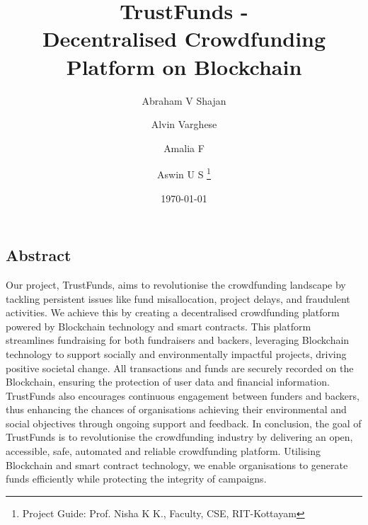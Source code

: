 \documentclass[10pt,A4paper]{article}
\title{\bf{TrustFunds -\\
Decentralised Crowdfunding Platform on Blockchain}}
\author{Abraham V Shajan \and Alvin Varghese \and Amalia F \and Aswin U S 
\thanks {Project Guide: Prof. Nisha K K., Faculty, CSE, RIT-Kottayam}}
\date{\today}
\begin{document}
\maketitle
\vspace{-20pt}
\begin{center}
\section*{Abstract}
\end{center}

Our project, TrustFunds, aims to revolutionise the crowdfunding landscape by tackling persistent issues like fund misallocation, project delays, and fraudulent activities. We achieve this by creating a decentralised crowdfunding platform powered by Blockchain technology and smart contracts.
This platform streamlines fundraising for both fundraisers and backers, leveraging Blockchain technology to support socially and environmentally impactful projects, driving positive societal change. All transactions and funds are securely recorded on the Blockchain, ensuring the protection of user data and financial information.
TrustFunds also encourages continuous engagement between funders and backers, thus enhancing the chances of organisations achieving their environmental and social objectives through ongoing support and feedback.
In conclusion, the goal of TrustFunds is to revolutionise the crowdfunding industry by delivering an open, accessible, safe, automated and reliable crowdfunding platform. Utilising Blockchain and smart contract technology, we enable organisations to generate funds efficiently while protecting the integrity of campaigns.
\end{document}
